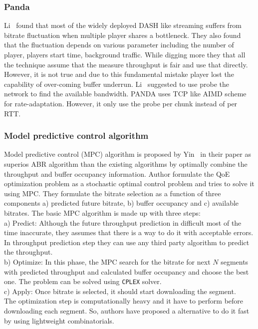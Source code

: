 \subsubsection{Panda\cite{140405}}
Li \etal\ found that most of the widely deployed DASH like streaming suffers from bitrate fluctuation when multiple player shares a bottleneck. They also found that the fluctuation depends on various parameter including the number of player, players start time, background traffic. While digging more they that all the technique assume that the measure throughput is fair and use that directly. However, it is not true and due to this fundamental mistake player lost the capability of over-coming buffer underrun. Li \etal\ suggested to use probe the network to find the available bandwidth. PANDA uses TCP like AIMD scheme for rate-adaptation. However, it only use the probe per chunk instead of per RTT.

\subsubsection{Model predictive control algorithm\cite{10.1145/2785956.2787486,10.1145/2670518.2673877}}
Model predictive control (MPC) algorithm is proposed by Yin \etal\ in their paper \cite{10.1145/2785956.2787486,10.1145/2670518.2673877} as superios ABR algorithm than the existing algorithms by optimally combine the throughput and buffer occupancy information. Author formulate the QoE optimization problem as a stochastic optimal control problem and tries to solve it using MPC. They formulate the bitrate selection as a function of three components a) predicted future bitrate, b) buffer occupancy and c) available bitrates. The basic MPC algorithm is made up with three steps: \\
a) Predict: Although the future throughput prediction in difficult most of the time inaccurate, they assumes that there is a way to do it with acceptable errors. In throughput prediction step they can use any third party algorithm to predict the throughput.\\
b) Optimize: In this phase, the MPC search for the bitrate for next $N$ segments with predicted throughput and calculated buffer occupancy and choose the best one. The problem can be solved using {\tt CPLEX} solver.\\
c) Apply: Once bitrate is selected, it should start downloading the segment.\\
The optimization step is computationally heavy and it have to perform before downloading each segment. So, authors have proposed a alternative to do it fast by using lightweight combinatorials.

